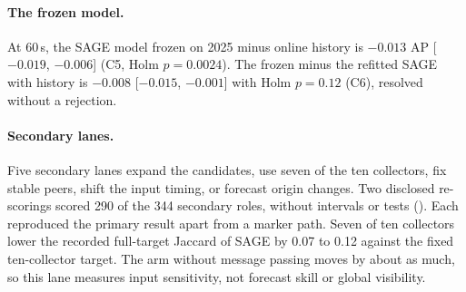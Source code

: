 \paragraph{The frozen model.}
At 60\,s, the SAGE model frozen on 2025 minus online history is $-0.013$ AP [$-0.019$, $-0.006$] (C5, Holm $p=0.0024$).
The frozen minus the refitted SAGE with history is $-0.008$ [$-0.015$, $-0.001$] with Holm $p=0.12$ (C6), resolved without a rejection.

\paragraph{Secondary lanes.}
Five secondary lanes expand the candidates, use seven of the ten collectors, fix stable peers, shift the input timing, or forecast origin changes.
Two disclosed re-scorings scored 290 of the 344 secondary roles, without intervals or tests ().
Each reproduced the primary result apart from a marker path.
Seven of ten collectors lower the recorded full-target Jaccard of SAGE by 0.07 to 0.12 against the fixed ten-collector target.
The arm without message passing moves by about as much, so this lane measures input sensitivity, not forecast skill or global visibility.
